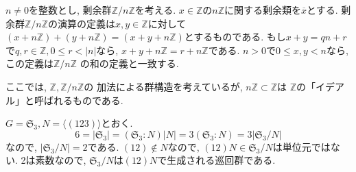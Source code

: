 $n\neq 0$を整数とし, 剰余群$\mathbb{Z}/n\mathbb{Z}$を考える.
$x \in \mathbb{Z}$の$n\mathbb{Z}$に関する剰余類を$\overline{x}$とする.
剰余群$\mathbb{Z}/n\mathbb{Z}$の演算の定義は$x,y \in \mathbb{Z}$に対して
$(x+n\mathbb{Z})+(y+n\mathbb{Z})=(x+y+n\mathbb{Z})$とするものである.
もし$x+y=qn+r$で$q,r\in \mathbb{Z}, 0\leq r < |n|$なら, 
$x+y+n\mathbb{Z}=r+n\mathbb{Z}$である.
$n>0$で$0\leq x,y <n$なら, この定義は$\mathbb{Z}/n\mathbb{Z}$
の和の定義と一致する.

ここでは, $\mathbb{Z}, \mathbb{Z}/n\mathbb{Z}$の
加法による群構造を考えているが, $n\mathbb{Z}\subset \mathbb{Z}$は
$\mathbb{Z}$の「イデアル」と呼ばれるものである.\newline

$G=\mathfrak{S}_3, N=\langle (123) \rangle$とおく.
\[ 6 = |\mathfrak{S}_3| = (\mathfrak{S}_3:N)|N|
=3(\mathfrak{S}_3:N)=3|\mathfrak{S}_3/N|\]
なので, $|\mathfrak{S}_3/N|=2$である.
$(12)\notin N$なので, $(12)N \in \mathfrak{S}_3/N$は単位元ではない.
2は素数なので, $\mathfrak{S}_3/N$は$(12)N$で生成される巡回群である.

